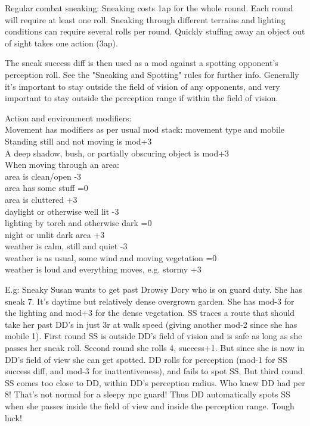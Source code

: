 Regular combat sneaking: Sneaking costs 1ap for the whole round. Each round will require at least one roll. Sneaking through different terrains and lighting conditions can require several rolls per round. Quickly stuffing away an object out of sight takes one action (3ap).

The sneak success diff is then used as a mod against a spotting opponent's perception roll. See the "Sneaking and Spotting" rules for further info.
Generally it's important to stay outside the field of vision of any opponents, and very important to stay outside the perception range if within the field of vision.

Action and environment modifiers:\\
Movement has modifiers as per usual mod stack: movement type and mobile\\
Standing still and not moving is mod+3\\
A deep shadow, bush, or partially obscuring object is mod+3\\

When moving through an area:\\
area is clean/open -3\\
area has some stuff =0\\
area is cluttered +3\\
daylight or otherwise well lit -3\\
lighting by torch and otherwise dark =0\\
night or unlit dark area +3\\
weather is calm, still and quiet -3\\
weather is as usual, some wind and moving vegetation =0\\
weather is loud and everything moves, e.g. stormy  +3

E.g: Sneaky Susan wants to get past Drowsy Dory who is on guard duty. She has sneak 7. It's daytime but relatively dense overgrown garden. She has mod-3 for the lighting and mod+3 for the dense vegetation. SS traces a route that should take her past DD's in just 3r at walk speed (giving another mod-2 since she has mobile 1). First round SS is outside DD's field of vision and is safe as long as she passes her sneak roll. Second round she rolls 4, success+1. But since she is now in DD's field of view she can get spotted. DD rolls for perception (mod-1 for SS success diff, and mod-3 for inattentiveness), and fails to spot SS. But third round SS comes too close to DD, within DD's perception radius. Who knew DD had per 8! That's not normal for a sleepy npc guard! Thus DD automatically spots SS when she passes inside the field of view and inside the perception range. Tough luck!

